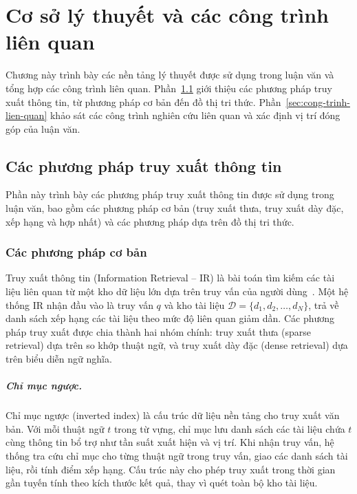 \chapter{Cơ sở lý thuyết và các công trình liên quan}
\label{chap:co-so-ly-thuyet}

Chương này trình bày các nền tảng lý thuyết được sử dụng trong luận văn và tổng hợp
các công trình liên quan. Phần~\ref{sec:cslt-truy-xuat} giới thiệu các phương pháp
truy xuất thông tin, từ phương pháp cơ bản đến đồ thị tri thức. Phần~\ref{sec:cong-trinh-lien-quan}
khảo sát các công trình nghiên cứu liên quan và xác định vị trí đóng góp của luận văn.

\section{Các phương pháp truy xuất thông tin}
\label{sec:cslt-truy-xuat}

Phần này trình bày các phương pháp truy xuất thông tin được sử dụng trong luận văn,
bao gồm các phương pháp cơ bản (truy xuất thưa, truy xuất dày đặc, xếp hạng và
hợp nhất) và các phương pháp dựa trên đồ thị tri thức.

\subsection{Các phương pháp cơ bản}
\label{subsec:phuong-phap-co-ban}

Truy xuất thông tin (Information Retrieval -- IR) là bài toán tìm kiếm các tài liệu
liên quan từ một kho dữ liệu lớn dựa trên truy vấn của người dùng~\cite{manning2008ir}.
Một hệ thống IR nhận đầu vào là truy vấn $q$ và kho tài liệu $\mathcal{D} = \{d_1, d_2, \ldots, d_N\}$, trả về danh sách xếp hạng các tài liệu theo mức độ
liên quan giảm dần. Các phương pháp truy xuất được chia thành hai nhóm chính: truy
xuất thưa (sparse retrieval) dựa trên so khớp thuật ngữ, và truy xuất dày đặc
(dense retrieval) dựa trên biểu diễn ngữ nghĩa.

\paragraph{Chỉ mục ngược.}
\label{subsec:chi-muc-nguoc}
Chỉ mục ngược (inverted index) là cấu trúc dữ liệu nền tảng cho truy xuất văn bản.
Với mỗi thuật ngữ $t$ trong từ vựng, chỉ mục lưu danh sách các tài liệu chứa $t$
cùng thông tin bổ trợ như tần suất xuất hiện và vị trí. Khi nhận truy vấn, hệ thống
tra cứu chỉ mục cho từng thuật ngữ trong truy vấn, giao các danh sách tài liệu,
rồi tính điểm xếp hạng. Cấu trúc này cho phép truy xuất trong thời gian gần tuyến
tính theo kích thước kết quả, thay vì quét toàn bộ kho tài liệu.

